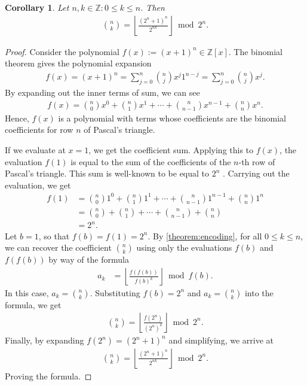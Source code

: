 \documentclass{article}
\theoremstyle{plain}
\newtheorem{corollary}{Corollary}[section]
\newcommand{\floor}[1]{\left\lfloor #1 \right\rfloor}
\begin{document}
\begin{corollary} \label{corollary:binomialcoefficients}
Let $n,k \in \mathbb{Z} : 0 \leq k \leq n$. Then
\begin{align*}
\binom{n}{k} = \floor{\frac{(2^n+1)^n}{2^{n k}}} \bmod{2^n} .
\end{align*}
\end{corollary}
\begin{proof}
Consider the polynomial $f(x) := (x+1)^n \in \mathbb{Z}[x]$. The binomial theorem gives the polynomial expansion
\begin{align*}
    f(x) = (x+1)^n = \sum_{j=0}^n \binom{n}{j} x^j 1^{n-j} = \sum_{j=0}^n \binom{n}{j} x^j .
\end{align*}
By expanding out the inner terms of sum, we can see
\begin{align*}
    f(x) = \binom{n}{0} x^0 + \binom{n}{1} x^1 + \cdots + \binom{n}{n-1} x^{n-1} + \binom{n}{n} x^{n} .
\end{align*}
Hence, $f(x)$ is a polynomial with terms whose coefficients are the binomial coefficients for row $n$ of Pascal's triangle. 

If we evaluate at $x=1$, we get the coefficient sum. Applying this to $f(x)$, the evaluation $f(1)$ is equal to the sum of the coefficients of the $n$-th row of Pascal's triangle. This sum is well-known to be equal to $2^n$ \cite{A000079}. Carrying out the evaluation, we get
\begin{align*}
f(1) &= \binom{n}{0} 1^0 + \binom{n}{1} 1^1 + \cdots + \binom{n}{n-1} 1^{n-1} + \binom{n}{n} 1^{n} \\
&= \binom{n}{0} + \binom{n}{1} + \cdots + \binom{n}{n-1} + \binom{n}{n} \\
&= 2^n .
\end{align*}
Let $b = 1$, so that $f(b) = f(1) = 2^n$. By \cref{theorem:encoding}, for all $0 \leq k \leq n$, we can recover the coefficient $\binom{n}{k}$ using only the evaluations $f(b)$ and $f(f(b))$ by way of the formula
\begin{align*}
    a_k &= \floor{\frac{f(f(b))}{f(b)^k}} \bmod{f(b)} .
\end{align*}
In this case, $a_k = \binom{n}{k}$. Substituting $f(b) = 2^n$ and $a_k = \binom{n}{k}$ into the formula, we get
\begin{align*}
    \binom{n}{k} = \floor{\frac{f(2^n)}{(2^n)^k}} \bmod{2^n} .
\end{align*}
Finally, by expanding $f(2^n) = (2^n+1)^n$ and simplifying, we arrive at
\begin{align*}
    \binom{n}{k} = \floor{\frac{(2^n+1)^n}{2^{nk}}} \bmod{2^n} .
\end{align*}
Proving the formula.
\end{proof}
\end{document}
